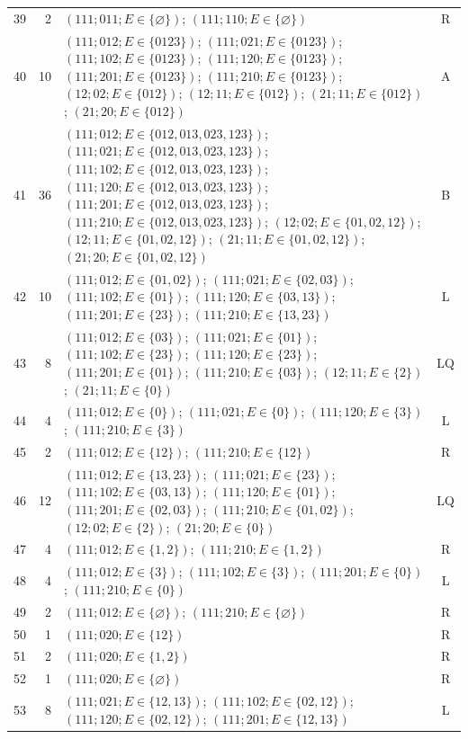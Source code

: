 \begin{longtable}{@{}r r p{10.1cm} c@{}}
39 & 2 & $(111;011;E\in\{\varnothing\})$; $(111;110;E\in\{\varnothing\})$ & R\\[1mm]
40 & 10 & $(111;012;E\in\{0123\})$; $(111;021;E\in\{0123\})$; $(111;102;E\in\{0123\})$; $(111;120;E\in\{0123\})$; $(111;201;E\in\{0123\})$; $(111;210;E\in\{0123\})$; $(12;02;E\in\{012\})$; $(12;11;E\in\{012\})$; $(21;11;E\in\{012\})$; $(21;20;E\in\{012\})$ & A\\[1mm]
41 & 36 & $(111;012;E\in\{012,013,023,123\})$; $(111;021;E\in\{012,013,023,123\})$; $(111;102;E\in\{012,013,023,123\})$; $(111;120;E\in\{012,013,023,123\})$; $(111;201;E\in\{012,013,023,123\})$; $(111;210;E\in\{012,013,023,123\})$; $(12;02;E\in\{01,02,12\})$; $(12;11;E\in\{01,02,12\})$; $(21;11;E\in\{01,02,12\})$; $(21;20;E\in\{01,02,12\})$ & B\\[1mm]
42 & 10 & $(111;012;E\in\{01,02\})$; $(111;021;E\in\{02,03\})$; $(111;102;E\in\{01\})$; $(111;120;E\in\{03,13\})$; $(111;201;E\in\{23\})$; $(111;210;E\in\{13,23\})$ & L\\[1mm]
43 & 8 & $(111;012;E\in\{03\})$; $(111;021;E\in\{01\})$; $(111;102;E\in\{23\})$; $(111;120;E\in\{23\})$; $(111;201;E\in\{01\})$; $(111;210;E\in\{03\})$; $(12;11;E\in\{2\})$; $(21;11;E\in\{0\})$ & LQ\\[1mm]
44 & 4 & $(111;012;E\in\{0\})$; $(111;021;E\in\{0\})$; $(111;120;E\in\{3\})$; $(111;210;E\in\{3\})$ & L\\[1mm]
45 & 2 & $(111;012;E\in\{12\})$; $(111;210;E\in\{12\})$ & R\\[1mm]
46 & 12 & $(111;012;E\in\{13,23\})$; $(111;021;E\in\{23\})$; $(111;102;E\in\{03,13\})$; $(111;120;E\in\{01\})$; $(111;201;E\in\{02,03\})$; $(111;210;E\in\{01,02\})$; $(12;02;E\in\{2\})$; $(21;20;E\in\{0\})$ & LQ\\[1mm]
47 & 4 & $(111;012;E\in\{1,2\})$; $(111;210;E\in\{1,2\})$ & R\\[1mm]
48 & 4 & $(111;012;E\in\{3\})$; $(111;102;E\in\{3\})$; $(111;201;E\in\{0\})$; $(111;210;E\in\{0\})$ & L\\[1mm]
49 & 2 & $(111;012;E\in\{\varnothing\})$; $(111;210;E\in\{\varnothing\})$ & R\\[1mm]
50 & 1 & $(111;020;E\in\{12\})$ & R\\[1mm]
51 & 2 & $(111;020;E\in\{1,2\})$ & R\\[1mm]
52 & 1 & $(111;020;E\in\{\varnothing\})$ & R\\[1mm]
53 & 8 & $(111;021;E\in\{12,13\})$; $(111;102;E\in\{02,12\})$; $(111;120;E\in\{02,12\})$; $(111;201;E\in\{12,13\})$ & L\\[1mm]

\end{longtable}
